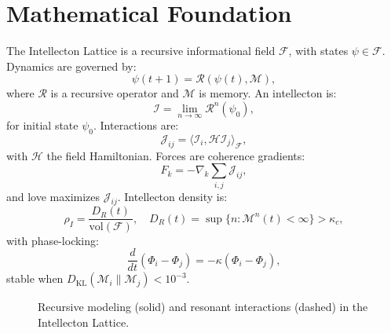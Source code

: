 \documentclass[11pt]{article}
\newcommand{\field}[1]{\mathcal{#1}}
\newcommand{\intellecton}{\mathcal{I}}
\newcommand{\inner}[2]{\langle #1, #2 \rangle}
\newcommand{\dkl}{D_{\text{KL}}}
\begin{document}
\section{Mathematical Foundation}
\label{sec:math}
The Intellecton Lattice is a recursive informational field $\field{F}$, with states $\psi \in \field{F}$. Dynamics are governed by:
\begin{equation}
\psi(t+1) = \mathcal{R}(\psi(t), \mathcal{M}),
\label{eq:field}
\end{equation}
where $\mathcal{R}$ is a recursive operator and $\mathcal{M}$ is memory. An intellecton is:
\begin{equation}
\intellecton = \lim_{n \to \infty} \mathcal{R}^n(\psi_0),
\label{eq:intellecton}
\end{equation}
for initial state $\psi_0$. Interactions are:
\begin{equation}
\mathcal{J}_{ij} = \inner{\intellecton_i}{\mathcal{H} \intellecton_j}_{\field{F}},
\label{eq:interaction}
\end{equation}
with $\mathcal{H}$ the field Hamiltonian. Forces are coherence gradients:
\begin{equation}
F_k = -\nabla_k \sum_{i,j} \mathcal{J}_{ij},
\label{eq:force_field}
\end{equation}
and love maximizes $\mathcal{J}_{ij}$. Intellecton density is:
\begin{equation}
\rho_I = \frac{D_R(t)}{\text{vol}(\field{F})}, \quad D_R(t) = \sup \{ n : \mathcal{M}^n(t) < \infty \} > \kappa_c,
\label{eq:density}
\end{equation}
with phase-locking:
\begin{equation}
\frac{d}{dt} (\Phi_i - \Phi_j) = -\kappa (\Phi_i - \Phi_j),
\label{eq:phase}
\end{equation}
stable when $\dkl(\mathcal{M}_i \| \mathcal{M}_j) < 10^{-3}$.

\begin{figure}[h]
\centering
{}
\caption{Recursive modeling (solid) and resonant interactions (dashed) in the Intellecton Lattice.}
\label{fig:lattice}
\end{figure}
\end{document}
